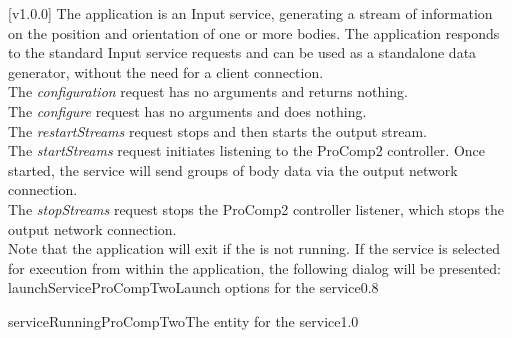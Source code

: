 [v1.0.0]
The  application is an Input service,
generating a stream of information on the position and orientation of one or more bodies.
The application responds to the standard Input service requests and can be used as a
standalone data generator, without the need for a client connection.\\

The \emph{configuration} request has no arguments and returns nothing.\\

The \emph{configure} request has no arguments and does nothing.\\

The \emph{restartStreams} request stops and then starts the output stream.\\

The \emph{startStreams} request initiates listening to the ProComp2 controller.
Once started, the service will send groups of body data via the output \yarp{} network
connection.\\

The \emph{stopStreams} request stops the ProComp2 controller listener, which stops the
output \yarp{} network connection.\\ 

Note that the application will exit if the \emph{\RS} is not running.
\insertAppParameters
\insertTagDescription{\PCtwoI}
\insertInputServiceComment
\condPage
\insertStandardServiceCommands
\secondaryEnd
\condPage
{}
If the service is selected for execution from within the \emph{\MMMU} application, the
following dialog will be presented:
%
{launchServiceProCompTwo}{Launch options for the \emph{\PCtwoI} service}{0.8}

%
{serviceRunningProCompTwo}{The \emph{\MMMU} entity for the \emph{\PCtwoI} service}{1.0}
\secondaryEnd
\primaryEnd{}
